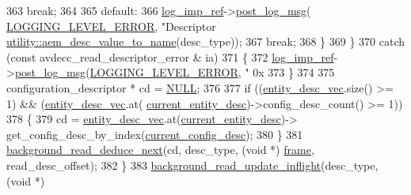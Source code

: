 \begin{DoxyCode}
363                 \textcolor{keywordflow}{break};
364 
365             \textcolor{keywordflow}{default}:
366                 \hyperlink{namespaceavdecc__lib_acbe3e2a96ae6524943ca532c87a28529}{log\_imp\_ref}->\hyperlink{classavdecc__lib_1_1log_a68139a6297697e4ccebf36ccfd02e44a}{post\_log\_msg}(
      \hyperlink{namespaceavdecc__lib_a501055c431e6872ef46f252ad13f85cdaf2c4481208273451a6f5c7bb9770ec8a}{LOGGING\_LEVEL\_ERROR}, \textcolor{stringliteral}{"Descriptor %
      \hyperlink{namespaceavdecc__lib_1_1utility_a6bdd02679e5a911a071d4aa03be341f0}{utility::aem\_desc\_value\_to\_name}(desc\_type));
367                 \textcolor{keywordflow}{break};
368             \}
369         \}
370         \textcolor{keywordflow}{catch} (\textcolor{keyword}{const} avdecc\_read\_descriptor\_error & ia)
371         \{
372             \hyperlink{namespaceavdecc__lib_acbe3e2a96ae6524943ca532c87a28529}{log\_imp\_ref}->\hyperlink{classavdecc__lib_1_1log_a68139a6297697e4ccebf36ccfd02e44a}{post\_log\_msg}(\hyperlink{namespaceavdecc__lib_a501055c431e6872ef46f252ad13f85cdaf2c4481208273451a6f5c7bb9770ec8a}{LOGGING\_LEVEL\_ERROR}, \textcolor{stringliteral}{"
      0x%
373         \}
374 
375         configuration\_descriptor * cd = \hyperlink{openavb__types__base__pub_8h_a070d2ce7b6bb7e5c05602aa8c308d0c4}{NULL};
376 
377         \textcolor{keywordflow}{if} ((\hyperlink{classavdecc__lib_1_1end__station__imp_a72edab41bc56e3c1757944a7df188a3d}{entity\_desc\_vec}.size() >= 1) && (\hyperlink{classavdecc__lib_1_1end__station__imp_a72edab41bc56e3c1757944a7df188a3d}{entity\_desc\_vec}.at(
      \hyperlink{classavdecc__lib_1_1end__station__imp_afd78c89df26ba7641e1adb764c0e827d}{current\_entity\_desc})->config\_desc\_count() >= 1))
378         \{
379             cd = \hyperlink{classavdecc__lib_1_1end__station__imp_a72edab41bc56e3c1757944a7df188a3d}{entity\_desc\_vec}.at(\hyperlink{classavdecc__lib_1_1end__station__imp_afd78c89df26ba7641e1adb764c0e827d}{current\_entity\_desc})->
      get\_config\_desc\_by\_index(\hyperlink{classavdecc__lib_1_1end__station__imp_a60b1af40d35e8a86b0082c54ab6cb6a8}{current\_config\_desc});
380         \}
381         \hyperlink{classavdecc__lib_1_1end__station__imp_ac9f6c6b15267ddc8bffecf2654a6f03d}{background\_read\_deduce\_next}(cd, desc\_type, (\textcolor{keywordtype}{void} *)
      \hyperlink{gst__avb__playbin_8c_ac8e710e0b5e994c0545d75d69868c6f0}{frame}, read\_desc\_offset);
382     \}
383     \hyperlink{classavdecc__lib_1_1end__station__imp_a9ed35744b83a722e59dee6fbf729bf51}{background\_read\_update\_inflight}(desc\_type, (\textcolor{keywordtype}{void} *)
}}
\end{DoxyCode}
